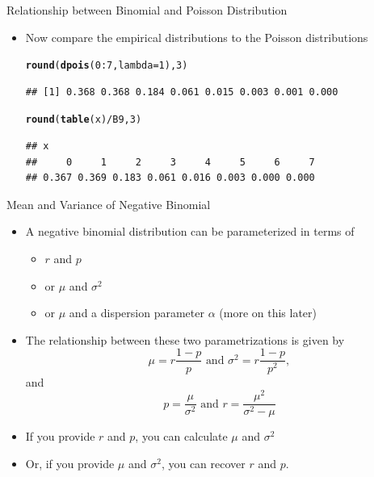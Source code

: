 \documentclass[xcolor=x11names,compress]{beamer}\usepackage[]{graphicx}\usepackage[]{color}
\makeatletter
\newcommand{\hlnum}[1]{\textcolor[rgb]{0.686,0.059,0.569}{#1}}%
\newcommand{\hlopt}[1]{\textcolor[rgb]{0,0,0}{#1}}%
\newcommand{\hlstd}[1]{\textcolor[rgb]{0.345,0.345,0.345}{#1}}%
\newcommand{\hlkwc}[1]{\textcolor[rgb]{0.333,0.667,0.333}{#1}}%
\newcommand{\hlkwd}[1]{\textcolor[rgb]{0.737,0.353,0.396}{\textbf{#1}}}%
\newenvironment{kframe}{%
 \def\at@end@of@kframe{}%
 \ifinner\ifhmode%
  \def\at@end@of@kframe{\end{minipage}}%
  \begin{minipage}{\columnwidth}%
 \fi\fi%
 \def\FrameCommand##1{\hskip\@totalleftmargin \hskip-\fboxsep
 \colorbox{shadecolor}{##1}\hskip-\fboxsep
     \hskip-\linewidth \hskip-\@totalleftmargin \hskip\columnwidth}%
 \MakeFramed {\advance\hsize-\width
   \@totalleftmargin\z@ \linewidth\hsize
   \@setminipage}}%
 {\par\unskip\endMakeFramed%
 \at@end@of@kframe}
\newenvironment{knitrout}{}{} %
\makeatother
\begin{document}
\begin{frame}[fragile]{Relationship between Binomial and Poisson Distribution}
  \begin{itemize}
\item Now compare the empirical distributions to the Poisson distributions
\begin{knitrout}\tiny
{}\color{fgcolor}\begin{kframe}
\begin{alltt}
\hlkwd{round}\hlstd{(}\hlkwd{dpois}\hlstd{(}\hlnum{0}\hlopt{:}\hlnum{7}\hlstd{,}\hlkwc{lambda}\hlstd{=}\hlnum{1}\hlstd{),}\hlnum{3}\hlstd{)}
\end{alltt}
\begin{verbatim}
## [1] 0.368 0.368 0.184 0.061 0.015 0.003 0.001 0.000
\end{verbatim}
\begin{alltt}
\hlkwd{round}\hlstd{(}\hlkwd{table}\hlstd{(x)}\hlopt{/}\hlstd{B9,}\hlnum{3}\hlstd{)}
\end{alltt}
\begin{verbatim}
## x
##     0     1     2     3     4     5     6     7 
## 0.367 0.369 0.183 0.061 0.016 0.003 0.000 0.000
\end{verbatim}
\end{kframe}
\end{knitrout}
\end{itemize}
\end{frame}




\begin{frame}{Mean and Variance of Negative Binomial}
  \begin{itemize}
  \item A negative binomial distribution can be parameterized in terms of
    \begin{itemize}
    \item $r$ and $p$
    \item or $\mu$ and $\sigma^2$
    \item or $\mu$ and a dispersion parameter $\alpha$ (more on this later)
    \end{itemize}
  \item The relationship between these two parametrizations is given by
    \begin{equation*}
      \mu=r\frac{1-p}{p}\mbox{ and } \sigma^2=r\frac{1-p}{p^2},
    \end{equation*}
    and
    \begin{equation*}
      p=\frac{\mu}{\sigma^2} \mbox{ and } r=\frac{\mu^2}{\sigma^2-\mu}
    \end{equation*}
  \item If you provide $r$ and $p$, you can calculate $\mu$
        and $\sigma^2$
  \item Or, if you provide $\mu$ and $\sigma^2$, you can recover
        $r$ and $p$.
  \end{itemize}
\end{frame}
\end{document}
